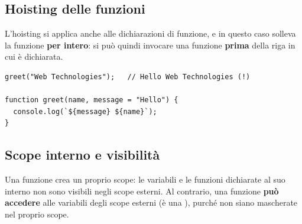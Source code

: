 \subsection{Hoisting delle funzioni}

L'hoisting si applica anche alle dichiarazioni di funzione, e in questo caso
solleva la funzione \textbf{per intero}: si può quindi invocare una funzione
\textbf{prima} della riga in cui è dichiarata.

\begin{affianco}[0.52][c]
\begin{lstlisting}[style=js, name=hoisting-funzioni.js]
greet("Web Technologies");   // Hello Web Technologies (!)

function greet(name, message = "Hello") {
  console.log(`${message} ${name}`);
}
\end{lstlisting}
\risultato
\begin{immagine}
\end{immagine}
\end{affianco}

\subsection{Scope interno e visibilità}

Una funzione crea un proprio scope: le variabili e le funzioni dichiarate al suo
interno non sono visibili negli scope esterni. Al contrario, una funzione
\textbf{può accedere} alle variabili degli scope esterni (è una ),
purché non siano mascherate nel proprio scope.


